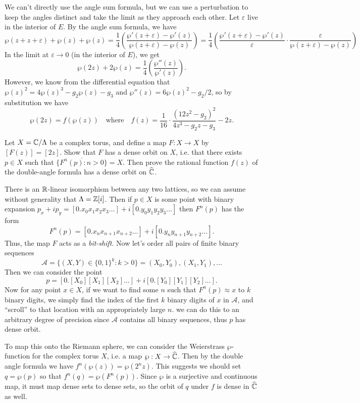 \documentclass{pset}
\begin{document}
\begin{solution}
  We can't directly use the angle sum formula, but we can use a perturbation to keep the angles distinct and take the limit as they approach each other. Let $\varepsilon$ live in the interior of $E$. By the angle sum formula, we have
  \[
  \wp(z+z+\varepsilon) + \wp(z)+\wp(z) = \frac{1}{4}\left(\frac{\wp'(z+\varepsilon) - \wp'(z)}{\wp(z+\varepsilon) - \wp(z)}\right) = \frac{1}{4}\left(\frac{\wp'(z+\varepsilon) - \wp'(z)}{\varepsilon}\cdot \frac{\varepsilon}{\wp(z+\varepsilon) - \wp(z)}\right)\]
  In the limit at $\varepsilon \to 0$ (in the interior of $E$), we get
  \[
    \wp(2z) + 2\wp(z) = \frac{1}{4}\left(\frac{\wp''(z)}{\wp'(z)}\right).
  \]
  However, we know from the differential equation that $\wp(z)^2 =4\wp(z)^3-g_2\wp(z)-g_3$ and $\wp''(z) = 6\wp(z)^2 - g_2/2$, so by substitution we have
  \[
    \wp(2z) = f(\wp(z))\quad\textrm{where}\quad f(z)=\frac{1}{16}\cdot \frac{(12z^2-g_2)^2}{4z^3-g_2z-g_3} - 2z.
  \]
\end{solution}

\begin{problem}{5.14}
  Let $X= \mathbb{C}/\Lambda$ be a complex torus, and define a map $F : X \to X$ by $[F(z)]=[2z]$. Show that $F$ has a dense orbit on $X$, i.e. that there exists $p\in X$ such that $\overline{\{ F^n(p) : n>0\}}=X$. Then prove the rational function $f(z)$ of the double-angle formula has a dense orbit on $\widehat{\mathbb{C}}$.
\end{problem}

\begin{solution}
  There is an $\mathbb{R}$-linear isomorphism between any two lattices, so we can assume without generality that $\Lambda = \mathbb{Z}[i]$. Then if $p\in X$ is some point with binary expansion $p_x + ip_y = [0.x_0x_1x_2x_3\ldots] + i[0.y_0y_1y_2y_3\ldots]$ then $F^n(p)$ has the form
  \[
    F^n(p) = [0.x_{n}x_{n+1}x_{n+2}\ldots] + i[0.y_ny_{n+1}y_{n+2}\ldots].
  \]
  Thus, the map $F$ acts as a \emph{bit-shift}. Now let's order all pairs of finite binary sequences 
  \[
    \mathcal{A} = \{ (X,Y) \in \{0,1\}^k : k > 0\} = (X_0, Y_0), (X_1, Y_1), \ldots
  \]
  Then we can consider the point \[p = [0.[X_0][X_1][X_2]\ldots] + i[0.[Y_0][Y_1][Y_2]\ldots].\]
  Now for any point $x\in X$, if we want to find some $n$ such that $F^n(p)\approx x$ to $k$ binary digits, we simply find the index of the first $k$ binary digits of $x$ in $\mathcal{A}$, and ``scroll'' to that location with an appropriately large $n$. we can do this to an arbitrary degree of precision since $\mathcal{A}$ contains all binary sequences, thus $p$ has dense orbit.

  To map this onto the Riemann sphere, we can consider the Weierstrass $\wp$-function for the complex torus $X$, i.e. a map $\wp : X \to \widehat{\mathbb{C}}$. Then by the double angle formula we have $f^n(\wp(z)) = \wp(2^n z)$. This suggests we should set $q=\wp(p)$ so that $f^n(q) = \wp(F^n(p))$. Since $\wp$ is a surjective and continuous map, it must map dense sets to dense sets, so the orbit of $q$ under $f$ is dense in $\widehat{\mathbb{C}}$ as well.
\end{solution}
\end{document}

